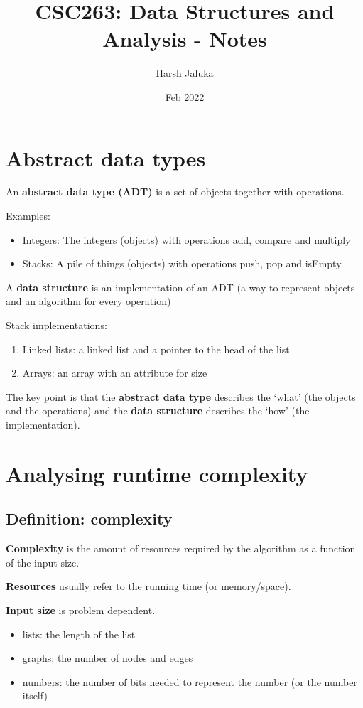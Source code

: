 \documentclass[11pt]{article}
\title{CSC263: Data Structures and Analysis - Notes}
\author{Harsh Jaluka}
\date{Feb 2022}
\begin{document}
\begin{titlepage}
\maketitle 
\end{titlepage}

\newpage
\tableofcontents

\newpage 
\section{Abstract data types}
An \textbf{abstract data type (ADT)} is a set of objects together with operations. 

Examples:
\begin{itemize}
    \item Integers: The integers (objects) with operations add, compare and multiply
    \item Stacks: A pile of things (objects) with operations push, pop and isEmpty
\end{itemize}

A \textbf{data structure} is an implementation of an ADT (a way to represent objects and an algorithm for every operation) 

Stack implementations: 
\begin{enumerate}
    \item Linked lists: a linked list and a pointer to the head of the list
    \item Arrays: an array with an attribute for size
\end{enumerate}
The key point is that the \textbf{abstract data type} describes the `what' (the objects and the operations) and the \textbf{data structure} describes the `how' (the implementation).

\newpage 
\section{Analysing runtime complexity}
\subsection{Definition: complexity}
\textbf{Complexity} is the amount of resources required by the algorithm as a function of the input size.

\textbf{Resources} usually refer to the running time (or memory/space). 

\textbf{Input size} is problem dependent. 
\begin{itemize}
    \item lists: the length of the list
    \item graphs: the number of nodes and edges 
    \item numbers: the number of bits needed to represent the number (or the number itself) 
\end{itemize}
\end{document}
